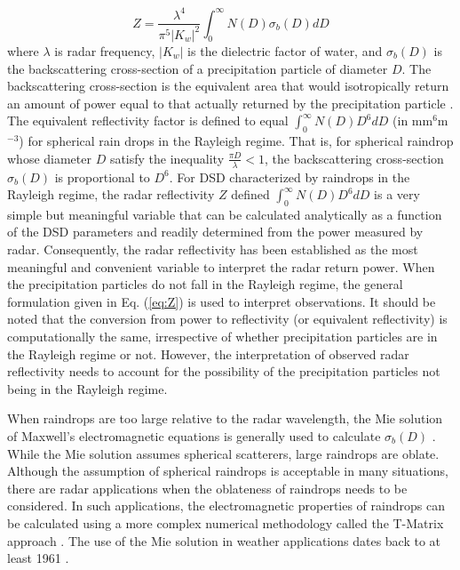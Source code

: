 \documentclass[10pt]{ietbook}
\begin{document}
\begin{equation} \label{eq:Z}
Z=\frac {\lambda ^4} {\pi ^5 |K_w|^2} \int_0^{\infty} N(D) \sigma _b(D) dD
\end{equation}
where $\lambda$ is radar frequency, $|K_w|$ is the dielectric factor of water, and $\sigma _b(D)$ is the 
backscattering cross-section of a precipitation particle of diameter $D$.  The backscattering cross-section is the equivalent area that
would isotropically return an amount of power equal to that actually returned by the precipitation particle \cite{battan1973}.  
The equivalent reflectivity factor is defined to equal $\int_0^{\infty} N(D) D^6 dD$ (in mm${^6}$m$^{-3}$) for spherical rain drops
in the Rayleigh regime.  That is, for spherical raindrop whose diameter $D$ satisfy the inequality $\frac {\pi D} {\lambda} < 1$, the
backscattering cross-section $\sigma_b(D)$ is proportional to $D^6$.  For DSD characterized by raindrops in the Rayleigh regime, 
the radar reflectivity $Z$ defined $\int _0 ^{\infty} N(D) D^6 dD$ is a very simple but meaningful variable that can be calculated analytically
as a function of the DSD parameters and readily determined from the power measured by radar. Consequently, the radar reflectivity has
been established as the most meaningful and convenient variable to interpret the radar return power.  When the precipitation particles
do not fall in the Rayleigh regime, the general formulation given in Eq. (\ref{eq:Z}) is used to interpret observations.  It should be noted
that the conversion from
power to reflectivity (or equivalent reflectivity) is computationally the same, irrespective of whether precipitation particles are
in the Rayleigh regime or not.  However, the interpretation of observed radar reflectivity needs to account for the possibility of
the precipitation particles not being in the Rayleigh regime.

When raindrops are too large relative to the radar wavelength, the Mie solution of Maxwell's electromagnetic equations is generally used
to calculate $\sigma _b(D)$ \cite{bhmie2008}.  While the Mie solution assumes spherical scatterers, large raindrops are oblate.  
Although the assumption of spherical raindrops is acceptable in many situations, there are radar applications when the oblateness of 
raindrops needs to be considered.  In such applications, the electromagnetic properties of raindrops can be calculated using a 
more complex numerical methodology called the T-Matrix approach \cite{misch2002}. The use of the Mie solution in weather applications
dates back to at least 1961 \cite{battan1973}.
\end{document}
